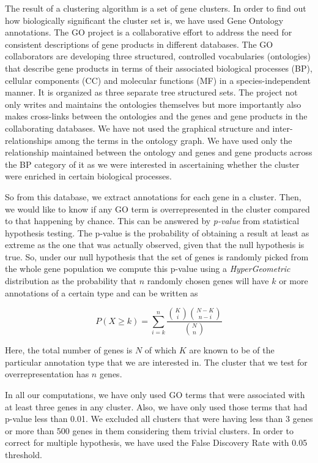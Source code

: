 The result of a clustering algorithm is a set of gene clusters. In order to find out how biologically significant the cluster set is, we have used 
Gene Ontology \citep{GO} annotations. The GO  project is a collaborative effort to address the need for consistent descriptions of gene products in different databases. 
The GO collaborators are developing three structured, controlled vocabularies (ontologies) that describe gene products in terms of their associated biological processes (BP), 
cellular components (CC) and molecular functions (MF) in a species-independent manner. It is organized as three separate tree structured sets. The project not only writes 
and maintains the ontologies themselves but more importantly also makes cross-links between the ontologies and the genes and gene products in the collaborating databases. 
We have not used the graphical structure and inter-relationships among the terms in the ontology graph. We have used only the relationship maintained between the 
ontology and genes and gene products across the BP category of it as we were interested in ascertaining whether the cluster were enriched in certain biological processes.

So from this database, we extract annotations for each gene in a cluster. Then, we would like to know if any GO term is  overrepresented in the cluster 
compared to that happening by chance. This can be answered by \textit{p-value} from statistical hypothesis testing. 
The p-value is the probability of obtaining a result at least as extreme as the one that was actually observed, given that the null hypothesis is true. 
So, under our null hypothesis that the set of genes is randomly picked from the whole gene population we compute this p-value using a \textit{HyperGeometric} distribution 
as the probability that $n$ randomly chosen genes will have $k$ or more annotations of a certain type and can be written as

\[
P(X \geq k) = \sum_{i=k}^{n} \frac{\binom{K}{i} \binom{N-K}{n-i}}{\binom {N}{n}}
\]
 
Here, the total number of genes is $N$ of which $K$ are known to be of the particular annotation type that we are interested in. The cluster that we test for overrepresentation has $n$ genes.

In all our computations, we have only used GO terms that were associated with at least three genes in any cluster. Also, we have only used those terms that had p-value less than 0.01. 
We excluded all clusters that were having less than 3 genes or more than 500 genes in them considering them trivial clusters. In order to correct for multiple hypothesis, we have used the False Discovery Rate with 0.05 threshold.  

